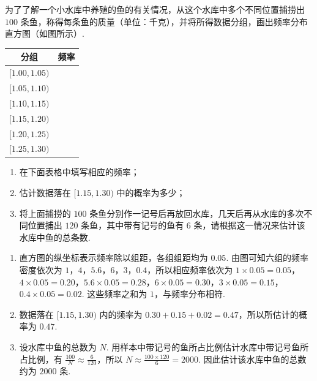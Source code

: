 \begin{problem}
为了了解一个小水库中养殖的鱼的有关情况，从这个水库中多个不同位置捕捞出 \(100\) 条鱼，称得每条鱼的质量（单位：千克），并将所得数据分组，画出频率分布直方图（如图所示）.

\begin{center}
\begin{tabular}{c|c}
\hline
分组 & 频率 \\
\hline
\([1.00,1.05)\) & \\
\([1.05,1.10)\) & \\
\([1.10,1.15)\) & \\
\([1.15,1.20)\) & \\
\([1.20,1.25)\) & \\
\([1.25,1.30)\) & \\
\hline
\end{tabular}
\end{center}

\begin{enumerate}
\item 在下面表格中填写相应的频率；
\item 估计数据落在 \([1.15, 1.30)\) 中的概率为多少；
\item 将上面捕捞的 \(100\) 条鱼分别作一记号后再放回水库，几天后再从水库的多次不同位置捕出 \(120\) 条鱼，其中带有记号的鱼有 \(6\) 条，请根据这一情况来估计该水库中鱼的总条数.
\end{enumerate}

\end{problem}

\begin{solution}
\begin{enumerate}
\item 直方图的纵坐标表示频率除以组距，各组组距均为 \(0.05\). 由图可知六组的频率密度依次为 \(1\)，\(4\)，\(5.6\)，\(6\)，\(3\)，\(0.4\)，所以相应频率依次为
\(1\times0.05=0.05\)，\(4\times0.05=0.20\)，\(5.6\times0.05=0.28\)，\(6\times0.05=0.30\)，\(3\times0.05=0.15\)，\(0.4\times0.05=0.02\).
这些频率之和为 \(1\)，与频率分布相符.
\item 数据落在 \([1.15,1.30)\) 内的频率为 \(0.30+0.15+0.02=0.47\)，所以所估计的概率为 \(0.47\).
\item 设水库中鱼的总数为 \(N\). 用样本中带记号的鱼所占比例估计水库中带记号鱼所占比例，有 \(\frac{100}{N}\approx\frac{6}{120}\)，所以 \(N\approx\frac{100\times120}{6}=2000\). 因此估计该水库中鱼的总数约为 \(2000\) 条.
\end{enumerate}
\end{solution}

